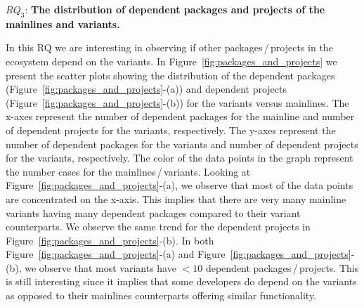 
$RQ_3$: \textbf{The distribution of dependent packages and projects of the mainlines and variants.}

In this RQ we are interesting in observing if other packages\,/\,projects in the ecosystem depend on the variants.
In Figure~\ref{fig:packages_and_projects} we present the scatter plots showing the distribution of the dependent packages (Figure~\ref{fig:packages_and_projects}-(a)) and dependent projects (Figure~\ref{fig:packages_and_projects}-(b)) for the variants versus mainlines.
The x-axes represent the number of dependent packages for the mainline and number of dependent projects for the variants, respectively.
The y-axes represent the number of dependent packages for the variants and number of dependent projects for the variants, respectively.
The color of the data points in the graph represent the number cases for the mainlines\,/\,variants.
Looking at Figure~\ref{fig:packages_and_projects}-(a), we observe that most of the data points are concentrated on the x-axis. 
This implies that there are very many mainline variants having many dependent packages compared to their variant counterparts.
We observe the same trend for the dependent projects in Figure~\ref{fig:packages_and_projects}-(b).
In both Figure~\ref{fig:packages_and_projects}-(a) and Figure~\ref{fig:packages_and_projects}-(b), we observe that most variants have $<10$ dependent packages\,/\,projects. 
This is still interesting since it implies that some developers do depend on the variants as opposed to their mainlines counterparts offering similar functionality.

